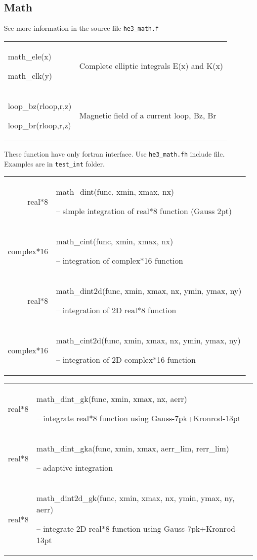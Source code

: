 \documentclass[a4paper]{article}
\begin{document}
\eject
\subsection*{Math}
See more information in the source file {\tt he3\_math.f}

\medskip
\noindent\begin{tabular}{p{4cm}p{11cm}}
math\_ele(x)\par
math\_elk(y)             & Complete elliptic integrals E(x) and K(x)\\
loop\_bz(rloop,r,z)\par
loop\_br(rloop,r,z)      & Magnetic field of a current loop, Bz, Br\\
\end{tabular}

\medskip
These function have only fortran interface. 
Use {\tt he3\_math.fh} include file. Examples are in {\tt test\_int} folder.

\medskip
\noindent\begin{tabular}{rp{11cm}}
real*8     & math\_dint(func, xmin, xmax, nx)\par   -- simple integration of real*8 function (Gauss 2pt)\\
complex*16 & math\_cint(func, xmin, xmax, nx)\par   -- integration of complex*16 function\\
real*8     & math\_dint2d(func, xmin, xmax, nx, ymin, ymax, ny)\par -- integration of 2D real*8 function\\
complex*16 & math\_cint2d(func, xmin, xmax, nx, ymin, ymax, ny)\par -- integration of 2D complex*16 function\\
\end{tabular}

\medskip
\noindent\begin{tabular}{rp{11cm}}
real*8    & math\_dint\_gk(func, xmin, xmax, nx, aerr)\par
            -- integrate real*8 function using Gauss-7pk+Kronrod-13pt\\
real*8    & math\_dint\_gka(func, xmin, xmax, aerr\_lim, rerr\_lim)\par
            -- adaptive integration\\
real*8    & math\_dint2d\_gk(func, xmin, xmax, nx, ymin, ymax, ny, aerr)\par
            -- integrate 2D real*8 function using Gauss-7pk+Kronrod-13pt\\
\end{tabular}


\end{document}

